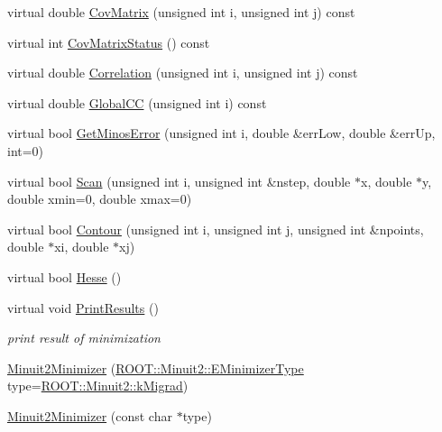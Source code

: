 \begin{DoxyCompactItemize}
virtual double \mbox{\hyperlink{classROOT_1_1Minuit2_1_1Minuit2Minimizer_a6ba10de01ab6e7228fa4908894de5619}{Cov\+Matrix}} (unsigned int i, unsigned int j) const
\item 
virtual int \mbox{\hyperlink{classROOT_1_1Minuit2_1_1Minuit2Minimizer_ad9f4873b9651626d2b83cf7eab826b0f}{Cov\+Matrix\+Status}} () const
\item 
virtual double \mbox{\hyperlink{classROOT_1_1Minuit2_1_1Minuit2Minimizer_a229e82025189e72b5a03cb4e3be19f4a}{Correlation}} (unsigned int i, unsigned int j) const
\item 
virtual double \mbox{\hyperlink{classROOT_1_1Minuit2_1_1Minuit2Minimizer_adde21edb0a67e0eef950049528cfb9a7}{Global\+CC}} (unsigned int i) const
\item 
virtual bool \mbox{\hyperlink{classROOT_1_1Minuit2_1_1Minuit2Minimizer_ab6c27c6f165821774dd304561e8956f5}{Get\+Minos\+Error}} (unsigned int i, double \&err\+Low, double \&err\+Up, int=0)
\item 
virtual bool \mbox{\hyperlink{classROOT_1_1Minuit2_1_1Minuit2Minimizer_a3f2f94c743a9b120a71da5ba23bd88cb}{Scan}} (unsigned int i, unsigned int \&nstep, double $\ast$x, double $\ast$y, double xmin=0, double xmax=0)
\item 
virtual bool \mbox{\hyperlink{classROOT_1_1Minuit2_1_1Minuit2Minimizer_a026780c27dd4b179817f826f49e36c8e}{Contour}} (unsigned int i, unsigned int j, unsigned int \&npoints, double $\ast$xi, double $\ast$xj)
\item 
virtual bool \mbox{\hyperlink{classROOT_1_1Minuit2_1_1Minuit2Minimizer_a0cfd04fde73c157de423705625ede51c}{Hesse}} ()
\item 
virtual void \mbox{\hyperlink{classROOT_1_1Minuit2_1_1Minuit2Minimizer_a0caadc2005eac5d87fc7345bd54decf0}{Print\+Results}} ()
\begin{DoxyCompactList}\small\item\em print result of minimization \end{DoxyCompactList}\item 
\mbox{\hyperlink{classROOT_1_1Minuit2_1_1Minuit2Minimizer_a0b75191bcd9e23e8dd5fbe6629c01704}{Minuit2\+Minimizer}} (\mbox{\hyperlink{namespaceROOT_1_1Minuit2_abdfae3dff24b1dc5a23955c06fe2a8d6}{R\+O\+O\+T\+::\+Minuit2\+::\+E\+Minimizer\+Type}} type=\mbox{\hyperlink{namespaceROOT_1_1Minuit2_abdfae3dff24b1dc5a23955c06fe2a8d6ad4b108176192edd930579158f0467e8f}{R\+O\+O\+T\+::\+Minuit2\+::k\+Migrad}})
\item 
\mbox{\hyperlink{classROOT_1_1Minuit2_1_1Minuit2Minimizer_aab2c36bd9eb8229d205b00d9573f550d}{Minuit2\+Minimizer}} (const char $\ast$type)

\end{DoxyCompactItemize}

